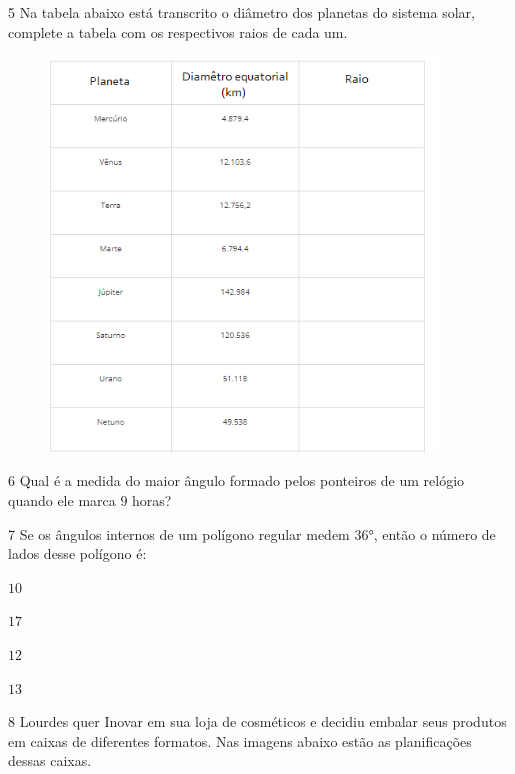 \num{5}  Na tabela abaixo está transcrito o diâmetro dos planetas do sistema
solar, complete a tabela com os respectivos raios de cada um.

\begin{figure}
\includegraphics[width=4.05833in,height=4.13212in]{./imgSAEB_6_MAT/media/image48.png}
\end{figure}

\reduline{\hfill}


\num{6}  Qual é a medida do maior ângulo formado pelos ponteiros de um relógio
quando ele marca $9$ horas?


\num{7}  Se os ângulos internos de um polígono regular medem $36$°, então o
número de lados desse polígono é:

\begin{escolha}
\item $10$
\item $17$
\item $12$
\item $13$
\end{escolha}


\num{8}  Lourdes quer Inovar em sua loja de cosméticos e decidiu embalar seus
produtos em caixas de diferentes formatos. Nas imagens abaixo estão as
planificações dessas caixas.

